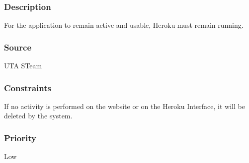 \subsubsection{Description}
For the application to remain active and usable, Heroku must remain running.
\subsubsection{Source}
UTA STeam
\subsubsection{Constraints}
If no activity is performed on the website or on the Heroku Interface, it will be deleted by the system.
\subsubsection{Priority}
Low
